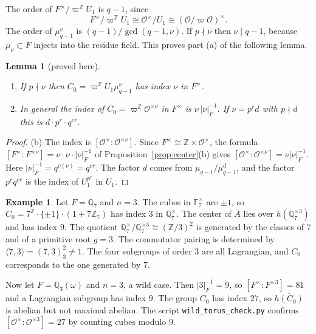 \documentclass[12pt,letterpaper]{article}
\numberwithin{equation}{section}
\newtheorem{lemma}[theorem]{Lemma}
\theoremstyle{definition}
\newtheorem{xexample}[theorem]{Example}
\newcommand{\proved}{proved here}
\newcommand{\Z}{\mathbb Z}
\newcommand{\Q}{\mathbb Q}
\newcommand{\OF}{\mathcal O}
\newcommand{\vp}{\varpi}
\newcommand{\bA}{\overline{A}}
\begin{document}
The order of $F^\times/\vp^{\Z}U_1$ is $q-1$, since
\begin{equation}\label{eq:quotient}
F^\times/\vp^{\Z}U_1\cong\OF^\times/U_1\cong(\OF/\vp\OF)^\times .
\end{equation}
The order of $\mu_{q-1}^\nu$ is $(q-1)/\gcd(q-1,\nu)$.  If $p\nmid\nu$ then $\nu\mid q-1$,
because $\mu_\nu\subset F$ injects into the residue field.  This proves part (a) of the
following lemma.

\begin{lemma}[\proved]\label{lem:index}
\begin{enumerate}[label=(\alph*),leftmargin=*,itemsep=1pt]
\item If $p\nmid\nu$ then $C_0=\vp^{\Z}U_1\mu_{q-1}^\nu$ has index $\nu$ in $F^\times$.
\item In general the index of $C_0=\vp^{\Z}\OF^{\times\nu}$ in $F^\times$ is
$\nu\,|\nu|_F^{-1}$.  If $\nu=p^rd$ with $p\nmid d$ this is $d\cdot p^r\cdot q^{er}$.
\end{enumerate}
\end{lemma}
\begin{proof}
(b) The index is $[\OF^\times:\OF^{\times\nu}]$.  Since $F^\times\cong\Z\times\OF^\times$,
the formula $[F^\times:F^{\times\nu}]=\nu\cdot\nu\cdot|\nu|_F^{-1}$ of
Proposition~\ref{prop:center}(b) gives $[\OF^\times:\OF^{\times\nu}]=\nu|\nu|_F^{-1}$.
Here $|\nu|_F^{-1}=q^{v(\nu)}=q^{er}$.  The factor $d$ comes from $\mu_{q-1}/\mu_{q-1}^d$,
and the factor $p^rq^{er}$ is the index of $U_1^{p^r}$ in $U_1$.
\end{proof}

\begin{xexample}\label{ex:torus-Q7}
Let $F=\Q_7$ and $n=3$.  The cubes in $\mathbb F_7^\times$ are $\pm1$, so
$C_0=7^{\Z}\cdot\{\pm1\}\cdot(1+7\Z_7)$ has index $3$ in $\Q_7^\times$.  The center of
$\bA$ lies over $h(\Q_7^{\times3})$ and has index $9$.  The quotient
$\Q_7^\times/\Q_7^{\times3}\cong(\Z/3)^2$ is generated by the classes of $7$ and of a
primitive root $g=3$.  The commutator pairing is determined by
$\langle 7,3\rangle=(7,3)_3^2\ne1$.  The four subgroups of order $3$ are all Lagrangian,
and $C_0$ corresponds to the one generated by $7$.

Now let $F=\Q_3(\omega)$ and $n=3$, a wild case.  Then $|3|_F^{-1}=9$, so
$[F^\times:F^{\times3}]=81$ and a Lagrangian subgroup has index $9$.  The group $C_0$ has
index $27$, so $\overline{h(C_0)}$ is abelian but not maximal abelian.  The script
\texttt{wild\_torus\_check.py} confirms $[\OF^\times:\OF^{\times3}]=27$ by counting cubes
modulo $9$.
\end{xexample}
\end{document}
